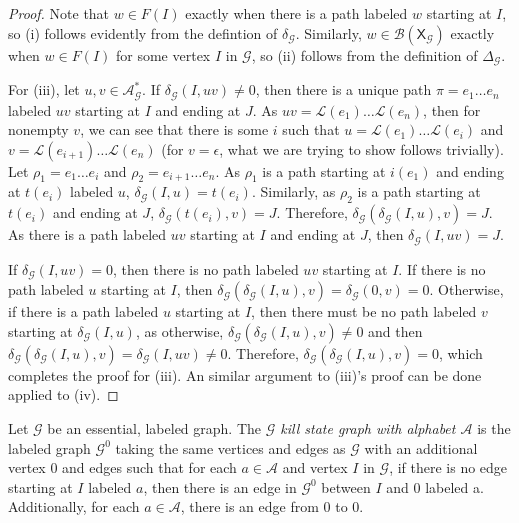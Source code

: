 \documentclass[hidelinks]{report}
\newcommand{\Ac}{\mathcal{A}}  %
\newcommand{\Lc}{\mathcal{L}}  %
\newcommand{\Gc}{\mathcal{G}}  %
\newcommand{\Bc}{\mathcal{B}}
\newcommand{\shift}[1]{\mathsf{X}_{#1}}
\newcommand{\term}[1]{\textit{#1}}
\theoremstyle{definition}
\begin{document}
\begin{proof}
    Note that \(w \in F(I)\) exactly when there is a path labeled \(w\) starting at \(I\), so (i) follows 
    evidently from the defintion of \(\delta_\Gc\). Similarly, \(w \in \Bc(\shift{\Gc})\) exactly 
    when \(w \in F(I)\) for some vertex \(I\) in \(\Gc\), so (ii) follows from the definition of \(\Delta_\Gc\).

    For (iii), let \(u, v \in \Ac_\Gc^*\). If \(\delta_\Gc(I, uv) \neq 0\), then there is a unique path \(\pi=e_1 \dots e_n\) 
    labeled \(uv\) starting at \(I\) and ending at \(J\). As \(uv = \Lc(e_1) \dots \Lc(e_n)\), then for 
    nonempty \(v\), we can see that
    there is some \(i\) such that \(u = \Lc(e_1) \dots \Lc(e_i)\) and 
    \(v = \Lc(e_{i+1}) \dots \Lc(e_n)\)
    (for \(v = \epsilon\), what we are trying to show follows trivially). Let \(\rho_1 = e_1 \dots e_i\) and \(\rho_2 = e_{i+1} \dots e_n\).
    As \(\rho_1\) is a path starting at \(i(e_1)\) and ending at \(t(e_i)\) labeled \(u\),
    \(\delta_\Gc(I, u) = t(e_i)\). Similarly, as \(\rho_2\) is a path starting 
    at \(t(e_i)\) and ending at \(J\), \(\delta_\Gc(t(e_i), v) = J\). Therefore, 
    \(\delta_\Gc(\delta_\Gc(I, u), v) = J\). As there is a path labeled \(uv\)
    starting at \(I\) and ending at \(J\), then \(\delta_\Gc(I, uv) = J\). 
    
    If \(\delta_\Gc(I, uv) = 0\), 
    then there is no path labeled \(uv\) starting at \(I\). If there is no path 
    labeled \(u\) starting at \(I\), then \(\delta_\Gc(\delta_\Gc(I, u), v) = \delta_\Gc(0, v) = 0\).
    Otherwise, if there is a path labeled \(u\) starting at \(I\), then there must 
    be no path labeled \(v\) starting at \(\delta_\Gc(I, u)\), as otherwise, 
    \(\delta_\Gc(\delta_\Gc(I, u), v) \neq 0\) and then 
    \(\delta_\Gc(\delta_\Gc(I, u), v) = \delta_\Gc(I, uv) \neq 0\). Therefore, \(\delta_\Gc(\delta_\Gc(I, u), v) = 0\),
    which completes the proof for (iii). An similar argument to (iii)'s proof can be done applied to (iv).
\end{proof}

\begin{definition}
    Let \(\Gc\) be an essential, labeled graph. The \term{\(\Gc\) kill state graph with alphabet \(\Ac\)}
    is the labeled graph \(\Gc^0\) taking the same vertices and edges as \(\Gc\) with 
    an additional vertex \(0\) and edges such that for each \(a \in \Ac\) and vertex \(I\) in \(\Gc\),
    if there is no edge starting at \(I\) labeled \(a\), then there is an edge in \(\Gc^0\) 
    between \(I\) and \(0\) labeled a. Additionally, for each \(a \in \Ac\), there is an 
    edge from \(0\) to \(0\).
\end{definition}
\end{document}
